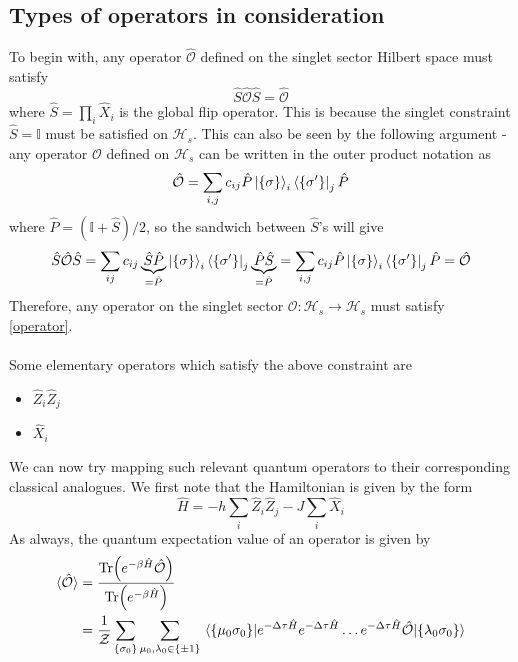 \documentclass[../journal_main.tex]{subfiles}
\begin{document}
\subsection{Types of operators in consideration}
To begin with, any operator $\hat{\mathcal{O}}$ defined on the singlet sector Hilbert space must satisfy 
\begin{equation}
    \hat{S} \hat{\mathcal{O}} \hat{S} = \hat{\mathcal{O}}
    \label{operator}
\end{equation}
where $\hat{S} = \prod_i \hat{X}_i$ is the global flip operator. This is because the singlet constraint $\hat{S} = \mathbb{I}$ must be satisfied on $\mathcal{H}_s$. This can also be seen by the following argument - any operator $\mathcal{O}$ defined on $\mathcal{H}_s$ can be written in the outer product notation as 
\[
    \hat{\mathcal{O}} = \sum_{i,j} c_{ij} \hat{P}\ket{\{\sigma\}}_i \bra{\{\sigma '\}}_j \hat{P}
\]     
where $\hat{P} = (\mathbb{I} + \hat{S})/2$, so the sandwich between $\hat{S}$'s will give 
\begin{equation*}
    \hat{S} \hat{\mathcal{O}} \hat{S} = \sum_{ij} c_{ij} \underbrace{\hat{S}\hat{P}}_{ = \hat{P}} \ket{\{\sigma\}}_i \bra{\{\sigma '\}}_j \underbrace{\hat{P} \hat{S}}_{ = \hat{P}} = \sum_{i,j} c_{ij} \hat{P}\ket{\{\sigma\}}_i \bra{\{\sigma '\}}_j \hat{P} = \hat{\mathcal{O}}
\end{equation*}
Therefore, any operator on the singlet sector $\mathcal{O}: \mathcal{H}_s \to \mathcal{H}_s$ must satisfy  \eqref{operator}.~\\~\\
Some elementary operators which satisfy the above constraint are 
\begin{itemize}
    \setlength{\itemsep}{0.1em}
    \item $\hat{Z}_i \hat{Z}_j$
    \item $\hat{X}_i$   
\end{itemize} 
We can now try mapping such relevant quantum operators to their corresponding classical analogues.  
We first note that the Hamiltonian is given by the form 
\[
    \hat{H} = - h \sum_i \hat{Z}_i \hat{Z}_j - J \sum_i \hat{X}_i 
\]
As always, the quantum expectation value of an operator is given by 
\begin{align*}
    \langle {\hat{\mathcal{O}}} \rangle  &= \frac{\Tr(e^{-\beta \hat{H}}\hat{\mathcal{O}})}{\Tr(e^{-\beta \hat{H}})} \\
    &= \frac{1}{\mathcal{Z}} \sum_{\{\sigma_0 \}} \sum_{\mu_0, \lambda_0 \in \{\pm 1\}} \mel{\{\mu_0 \sigma _0\}}{e^{-\Delta \tau \hat{H}} e^{-\Delta \tau \hat{H}} \ldots e^{-\Delta \tau \hat{H}} \hat{\mathcal{O}}}{\{\lambda_0 \sigma _0\}}    
\end{align*}
\end{document}
